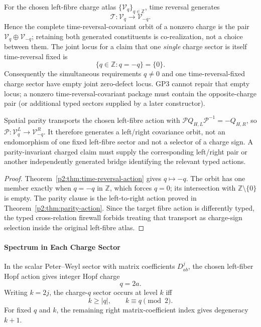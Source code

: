 \documentclass[12pt,a4paper]{article}
\begin{document}
\begin{corollary}
\label{p2d:cor:joint-hopf-charge-discrete-symmetry}
For the chosen left-fibre charge atlas
\(\{\mathcal V_q\}_{q\in\mathbb Z}\), time reversal generates
\[
 \mathcal T:\mathcal V_q\longrightarrow\mathcal V_{-q}.
\]
Hence the complete time-reversal-covariant orbit of a nonzero charge is the
pair \(\mathcal V_q\oplus\mathcal V_{-q}\); retaining both generated
constituents is co-realization, not a choice between them.  The joint locus for
a claim that one \emph{single} charge sector is itself time-reversal fixed is
\[
 \boxed{\{q\in\mathbb Z:q=-q\}=\{0\}.}
\]
Consequently the simultaneous requirements \(q\neq0\) and one
time-reversal-fixed charge sector have empty joint zero-defect locus.  GP3
cannot repair that empty locus; a nonzero time-reversal-covariant package must
contain the opposite-charge pair (or additional typed sectors supplied by a
later constructor).

Spatial parity transports the chosen left-fibre action with
\(\mathcal P Q_{H,L}\mathcal P^{-1}=-Q_{H,R}\), so
\(\mathcal P:\mathcal V_q^L\to\mathcal V_{-q}^R\).
It therefore generates a left/right covariance orbit, not
an endomorphism of one fixed left-fibre sector and not a selector of a charge
sign.  A parity-invariant charged claim must supply the corresponding
left/right pair or another independently generated bridge identifying the
relevant typed actions.
\end{corollary}

\begin{proof}
Theorem~\ref{p2:thm:time-reversal-action} gives \(q\mapsto-q\).
The orbit has one member exactly when \(q=-q\) in \(\mathbb Z\), which forces
\(q=0\); its intersection with \(\mathbb Z\setminus\{0\}\) is empty.
The parity clause is the left-to-right action proved in
Theorem~\ref{p2:thm:parity-action}.  Since the target fibre action is differently
typed, the typed cross-relation firewall forbids treating that transport as
charge-sign selection inside the original left-fibre atlas.
\end{proof}

\paragraph{Spectrum in Each Charge Sector}

\begin{lemma}
\label{p2:lem:hopf-charge-selection-rule}
In the scalar Peter--Weyl sector with matrix coefficients \(D^j_{ab}\), the
chosen left-fiber Hopf action gives integer Hopf charge
\[
q=2a.
\]
Writing \(k=2j\), the charge-\(q\) sector occurs at level \(k\) iff
\[
k\ge |q|,
\qquad
k\equiv q \pmod 2.
\]
For fixed \(q\) and \(k\), the remaining right matrix-coefficient index gives
degeneracy \(k+1\).
\end{lemma}
\end{document}
